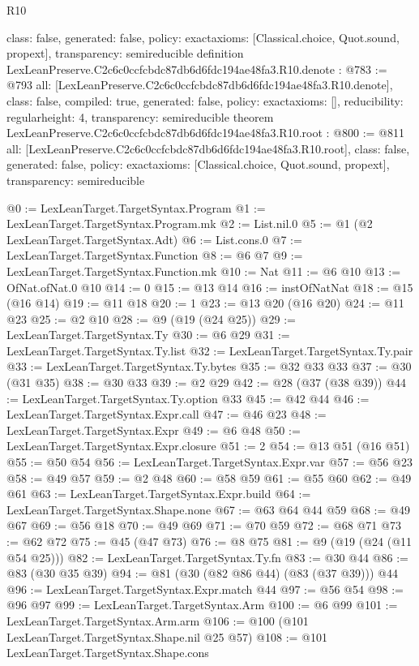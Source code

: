 \begin{lexlean}{R10}
\begin{coremodule}
{  class: false,
  generated: false,
  policy: exact{axioms: [Classical.choice, Quot.sound, propext]},
  transparency: semireducible
}
definition LexLeanPreserve.C2c6c0ccfcbdc87db6d6fdc194ae48fa3.R10.denote : @783 := @793 {
  all: [LexLeanPreserve.C2c6c0ccfcbdc87db6d6fdc194ae48fa3.R10.denote],
  class: false,
  compiled: true,
  generated: false,
  policy: exact{axioms: []},
  reducibility: regular{height: 4},
  transparency: semireducible
}
theorem LexLeanPreserve.C2c6c0ccfcbdc87db6d6fdc194ae48fa3.R10.root : @800 := @811 {
  all: [LexLeanPreserve.C2c6c0ccfcbdc87db6d6fdc194ae48fa3.R10.root],
  class: false,
  generated: false,
  policy: exact{axioms: [Classical.choice, Quot.sound, propext]},
  transparency: semireducible
}

@0 := LexLeanTarget.TargetSyntax.Program
@1 := LexLeanTarget.TargetSyntax.Program.mk
@2 := List.nil.{0}
@5 := @1 (@2 LexLeanTarget.TargetSyntax.Adt)
@6 := List.cons.{0}
@7 := LexLeanTarget.TargetSyntax.Function
@8 := @6 @7
@9 := LexLeanTarget.TargetSyntax.Function.mk
@10 := Nat
@11 := @6 @10
@13 := OfNat.ofNat.{0} @10
@14 := 0
@15 := @13 @14
@16 := instOfNatNat
@18 := @15 (@16 @14)
@19 := @11 @18
@20 := 1
@23 := @13 @20 (@16 @20)
@24 := @11 @23
@25 := @2 @10
@28 := @9 (@19 (@24 @25))
@29 := LexLeanTarget.TargetSyntax.Ty
@30 := @6 @29
@31 := LexLeanTarget.TargetSyntax.Ty.list
@32 := LexLeanTarget.TargetSyntax.Ty.pair
@33 := LexLeanTarget.TargetSyntax.Ty.bytes
@35 := @32 @33 @33
@37 := @30 (@31 @35)
@38 := @30 @33
@39 := @2 @29
@42 := @28 (@37 (@38 @39))
@44 := LexLeanTarget.TargetSyntax.Ty.option @33
@45 := @42 @44
@46 := LexLeanTarget.TargetSyntax.Expr.call
@47 := @46 @23
@48 := LexLeanTarget.TargetSyntax.Expr
@49 := @6 @48
@50 := LexLeanTarget.TargetSyntax.Expr.closure
@51 := 2
@54 := @13 @51 (@16 @51)
@55 := @50 @54
@56 := LexLeanTarget.TargetSyntax.Expr.var
@57 := @56 @23
@58 := @49 @57
@59 := @2 @48
@60 := @58 @59
@61 := @55 @60
@62 := @49 @61
@63 := LexLeanTarget.TargetSyntax.Expr.build
@64 := LexLeanTarget.TargetSyntax.Shape.none
@67 := @63 @64 @44 @59
@68 := @49 @67
@69 := @56 @18
@70 := @49 @69
@71 := @70 @59
@72 := @68 @71
@73 := @62 @72
@75 := @45 (@47 @73)
@76 := @8 @75
@81 := @9 (@19 (@24 (@11 @54 @25)))
@82 := LexLeanTarget.TargetSyntax.Ty.fn
@83 := @30 @44
@86 := @83 (@30 @35 @39)
@94 := @81 (@30 (@82 @86 @44) (@83 (@37 @39))) @44
@96 := LexLeanTarget.TargetSyntax.Expr.match @44
@97 := @56 @54
@98 := @96 @97
@99 := LexLeanTarget.TargetSyntax.Arm
@100 := @6 @99
@101 := LexLeanTarget.TargetSyntax.Arm.arm
@106 := @100 (@101 LexLeanTarget.TargetSyntax.Shape.nil @25 @57)
@108 := @101 LexLeanTarget.TargetSyntax.Shape.cons

\end{coremodule}
\end{lexlean}
